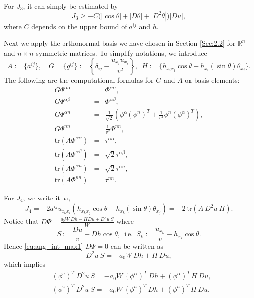 \documentclass[12pt]{article}
\numberwithin{equation}{section}
\theoremstyle{plain}
\theoremstyle{definition}
\theoremstyle{remark}
\begin{document}
For $J_3$, it can simply be estimated by
\begin{equation} \label{eq:ang_J3_est}
    J_3 \geq - C \Big(|\cos{\theta}| + |D\theta| + |D^2 \theta|\Big) |Du|,
\end{equation}
where $C$ depends on the upper bound of $a^{ij}$ and $h$.

Next we apply the orthonormal basis we have chosen in Section \ref{Sec:2.2} for 
$\mathbb{R}^n$ and $n\times n$ symmetric matrices. To simplify notations, we 
introduce
\begin{equation*}
    A := \{ a^{ij} \}, \quad G = \{ g^{ij} \} := \left\{ \delta_{ij} - \frac{u_{x_i} u_{x_j}}{v^2} \right\}, \,\,\,
    H := \Big\{ h_{x_i x_j} \cos \theta - h_{x_i} (\sin \theta)\theta_{x_j} \Big\}.
\end{equation*}
The following are the computational formulas for $G$ and $A$ on basis elements: 
\begin{eqnarray*}
     G \Phi^{\alpha \alpha} & = & \Phi^{\alpha \alpha}, \\
     G \Phi^{\alpha \beta} & = & \Phi^{\alpha \beta}, \\
     G \Phi^{\alpha n} & = & \frac{1}{\sqrt{2}} \left( \phi^{\alpha} (\phi^{n})^T + \frac{1}{v^2} \phi^{n} (\phi^{\alpha})^T \right), \\
     G \Phi^{n n} & = & \frac{1}{v^2} \Phi^{n n}, \\
     \text{tr}(A \Phi^{\alpha \alpha}) & = & \tau^{\alpha \alpha}, \\
     \text{tr}(A \Phi^{\alpha \beta}) & = & \sqrt{2} \tau^{\alpha \beta}, \\
     \text{tr}(A \Phi^{\alpha n}) & = & \sqrt{2} \tau^{\alpha n}, \\
     \text{tr}(A \Phi^{n n}) & = & \tau^{n n}. 
\end{eqnarray*}

For $J_4$, we write it as,
\begin{equation*}
    J_4 = - 2 a^{ij} u_{x_k x_i} \left(h_{x_k x_j} \cos \theta - h_{x_k} (\sin \theta )\theta_{x_j} \right) = - 2 \ \text{tr}(A \ D^2 u \ H ).
\end{equation*}
Notice that $\displaystyle D\Psi = \frac{a_0W\ Dh - HDu + D^2u \ S}{W}$
where
\begin{equation*}
     S:= \frac{Du}{v} - Dh\cos\theta,\,\,\,\text{i.e.}\,\,\,
     S_k  := \frac{u_{x_k}}{v} - h_{x_k} \cos \theta.
\end{equation*}
Hence \eqref{eq:ang_int_max1} $D\Psi = 0$ can be written as
\begin{equation}
    D^2u \  S = -a_0 W \ Dh + H \ Du,
\end{equation}
which implies 
\begin{equation} \label{eq:ang_int_max1_r}
\begin{split}
    &  (\phi^{\alpha})^T \  D^2 u \ S = -a_0 W \ (\phi^{\alpha})^T \ Dh + (\phi^{\alpha})^T \ H \ Du, \\ 
    &  (\phi^n)^T \  D^2 u \ S = -a_0 W \ (\phi^n)^T \ Dh + (\phi^n)^T \ H \ Du.
\end{split}
\end{equation}
\end{document}
